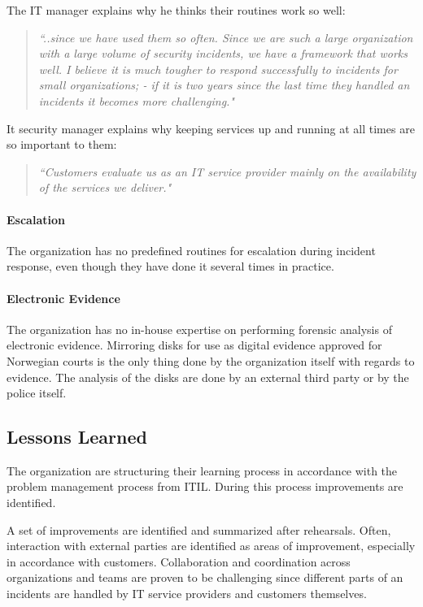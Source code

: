 The IT manager explains why he thinks their routines work so well:
\begin{quote}
\textit{``..since we have used them so often. Since we are such a large organization with a large volume of security incidents, we have a framework that works well. I believe it is much tougher to respond successfully to incidents for small organizations; - if it is two years since the last time they handled an incidents it becomes more challenging."}
\end{quote}

It security manager explains why keeping services up and running at all times are so important to them:
\begin{quote}
\textit{``Customers evaluate us as an IT service provider mainly on the availability of the services we deliver."}
\end{quote}

\paragraph{Escalation}
The organization has no predefined routines for escalation during incident response, even though they have done it several times in practice.

\paragraph{Electronic Evidence}
The organization has no in-house expertise on performing forensic analysis of electronic evidence. Mirroring disks for use as digital evidence approved for Norwegian courts is the only thing done by the organization itself with regards to evidence. The analysis of the disks are done by an external third party or by the police itself.

\subsection{Lessons Learned}
The organization are structuring their learning process in accordance with the problem management process from ITIL. During this process improvements are identified. 

A set of improvements are identified and summarized after rehearsals. Often, interaction with external parties are identified as areas of improvement, especially in accordance with customers. Collaboration and coordination across organizations and teams are proven to be challenging since different parts of an incidents are handled by IT service providers and customers themselves. 

